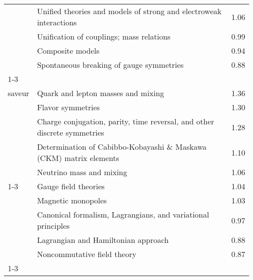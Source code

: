 \begin{longtable}[H]{p{}|p{}|p{}}
                                                                               & Unified theories and models of strong and electroweak interactions &  1.06 \\
                                                                               & Unification of couplings; mass relations &  0.99 \\
                                                                               & Composite models &  0.94 \\
                                                                               & Spontaneous breaking of gauge symmetries &  0.88 \\
\cline{1-3}
\multirow{5}{*}{\begin{tabular}{l}Changement de\\ saveur\end{tabular}} & Quark and lepton masses and mixing &  1.36 \\
                                                                               & Flavor symmetries &  1.30 \\
                                                                               & Charge conjugation, parity, time reversal, and other discrete symmetries &  1.28 \\
                                                                               & Determination of Cabibbo-Kobayashi \& Maskawa (CKM) matrix elements &  1.10 \\
                                                                               & Neutrino mass and mixing &  1.06 \\
\cline{1-3}
\multirow{5}{*}{\begin{tabular}{l}Chern-Simons\end{tabular}} & Gauge field theories &  1.04 \\
                                                                               & Magnetic monopoles &  1.03 \\
                                                                               & Canonical formalism, Lagrangians, and variational principles &  0.97 \\
                                                                               & Lagrangian and Hamiltonian approach &  0.88 \\
                                                                               & Noncommutative field theory &  0.87 \\
\cline{1-3}

\end{longtable}
